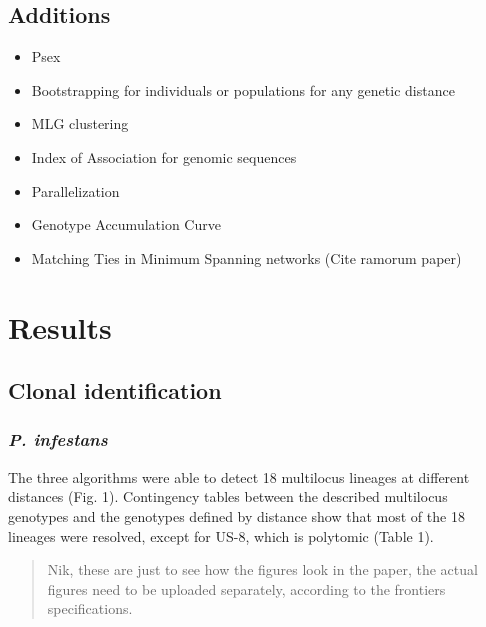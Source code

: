 \documentclass{frontiersSCNS} %
\begin{document}
\subsection*{Additions}\label{additions}

\begin{itemize}
\itemsep1pt\parskip0pt
\item
  Psex
\item
  Bootstrapping for individuals or populations for any genetic distance
\item
  MLG clustering
\item
  Index of Association for genomic sequences
\item
  Parallelization
\item
  Genotype Accumulation Curve
\item
  Matching Ties in Minimum Spanning networks (Cite ramorum paper)
\end{itemize}

\section*{Results}\label{results}

\subsection*{Clonal identification}\label{clonal-identification}

\subsubsection*{\texorpdfstring{\emph{P.
infestans}}{P. infestans}}\label{p.-infestans-1}

The three algorithms were able to detect 18 multilocus lineages at
different distances (Fig. 1). Contingency tables between the described
multilocus genotypes and the genotypes defined by distance show that
most of the 18 lineages were resolved, except for US-8, which is
polytomic (Table 1).

\begin{quote}
Nik, these are just to see how the figures look in the paper, the actual
figures need to be uploaded separately, according to the frontiers
specifications.
\end{quote}
\end{document}

